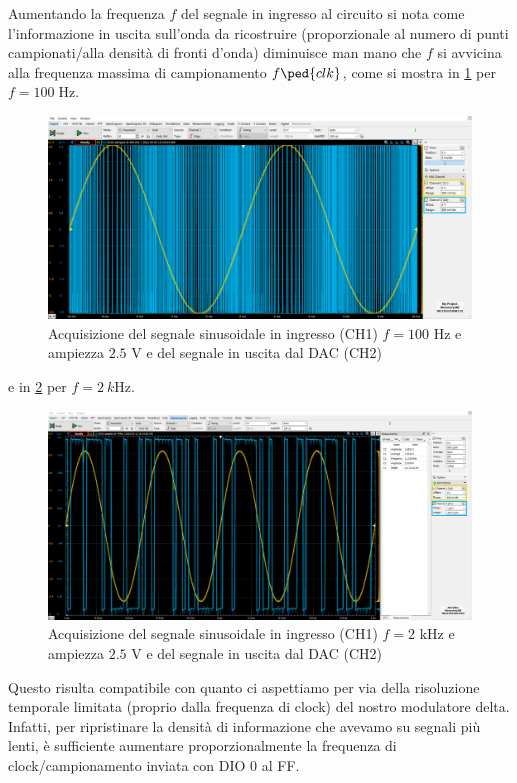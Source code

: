 \documentclass[10pt, a4paper, italian]{article}
\begin{document}
Aumentando la frequenza $f$ del segnale in ingresso al circuito si nota come
l'informazione in uscita sull'onda da ricostruire (proporzionale al numero di
punti campionati/alla densità di fronti d'onda) diminuisce man mano che $f$ si
avvicina alla frequenza massima di campionamento $f\ped{clk}$, come si mostra
in \cref{fig: sin100hz} per $f = 100 \; \si{\Hz}$.
\begin{figure}[htbp]
    \centering
	\includegraphics[width=\textwidth]{Conv.Sinusoide.100Hz.2}
    \caption{Acquisizione del segnale sinusoidale in ingresso (CH1)
    $f = 100$ Hz e ampiezza $2.5$ V e del segnale in uscita dal DAC (CH2)
    \label{fig: sin100hz}}
\end{figure}
e in \cref{fig: sin2khz} per $f = \SI{2}{k\Hz}$.
\begin{figure}[htbp]
    \centering
	\includegraphics[width=\textwidth]{sin2khz2.5v}
    \caption{Acquisizione del segnale sinusoidale in ingresso (CH1)
    $f = 2$ kHz e ampiezza $2.5$ V e del segnale in uscita dal DAC (CH2)
    \label{fig: sin2khz}}
\end{figure}

Questo risulta compatibile con quanto ci aspettiamo per via della risoluzione
temporale limitata (proprio dalla frequenza di clock) del nostro modulatore
delta. Infatti, per ripristinare la densità di informazione che avevamo su
segnali più lenti, è sufficiente aumentare proporzionalmente la frequenza
di clock/campionamento inviata con DIO 0 al FF.
\end{document}
